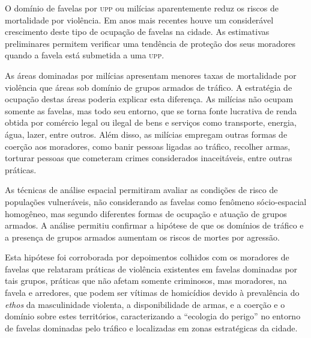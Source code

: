 \documentclass{article}
\begin{document}
O domínio de favelas por \textsc{upp} ou milícias aparentemente reduz os riscos de
mortalidade por violência. Em anos mais recentes houve um considerável
crescimento deste tipo de ocupação de favelas na cidade. As estimativas
preliminares permitem verificar uma tendência de proteção dos seus moradores
quando a favela está submetida a uma \textsc{upp}.

As áreas dominadas por milícias apresentam menores taxas de mortalidade por
violência que áreas sob domínio de grupos armados de tráfico. A estratégia de
ocupação destas áreas poderia explicar esta diferença. As milícias não ocupam
somente as favelas, mas todo seu entorno, que se torna fonte lucrativa de renda
obtida por comércio legal ou ilegal de bens e serviços como transporte, energia,
água, lazer, entre outros. Além disso, as milícias empregam outras formas de
coerção aos moradores, como banir pessoas ligadas ao tráfico, recolher armas,
torturar pessoas que cometeram crimes considerados inaceitáveis, entre outras
práticas.

As técnicas de análise espacial permitiram avaliar as condições de risco de
populações vulneráveis, não considerando as favelas como fenômeno sócio-espacial
homogêneo, mas segundo diferentes formas de ocupação e atuação de grupos
armados. A análise permitiu confirmar a hipótese de que os domínios de tráfico e
a presença de grupos armados aumentam os riscos de mortes por agressão.

Esta hipótese foi corroborada por depoimentos colhidos com os moradores de
favelas que relataram práticas de violência existentes em favelas dominadas por
tais grupos, práticas que não afetam somente criminosos, mas moradores, na
favela e arredores, que podem ser vítimas de homicídios devido à prevalência do
\textit{ethos}
da masculinidade violenta, a disponibilidade de armas, e a coerção e o domínio
sobre estes territórios, caracterizando a “ecologia do perigo” no entorno de
favelas dominadas pelo tráfico e localizadas em zonas estratégicas da cidade.
\end{document}
